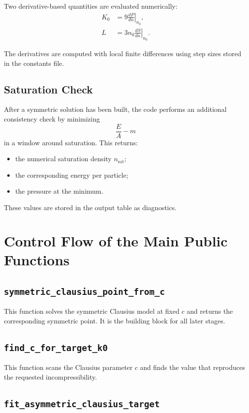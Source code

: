 \documentclass[11pt]{article}
\begin{document}
Two derivative-based quantities are evaluated numerically:
\begin{align}
K_0 &= 9 \left.\frac{dP}{dn}\right|_{n_0}, \\
L &= 3 n_0 \left.\frac{dS}{dn}\right|_{n_0}.
\end{align}

The derivatives are computed with local finite differences using step sizes
stored in the constants file.

\subsection{Saturation Check}

After a symmetric solution has been built, the code performs an additional
consistency check by minimizing
\[
\frac{E}{A} - m
\]
in a window around saturation. This returns:
\begin{itemize}
\item the numerical saturation density $n_{\mathrm{sat}}$;
\item the corresponding energy per particle;
\item the pressure at the minimum.
\end{itemize}

These values are stored in the output table as diagnostics.

\section{Control Flow of the Main Public Functions}

\subsection{\texttt{symmetric\_clausius\_point\_from\_c}}

This function solves the symmetric Clausius model at fixed $c$ and returns the
corresponding symmetric point. It is the building block for all later stages.

\subsection{\texttt{find\_c\_for\_target\_k0}}

This function scans the Clausius parameter $c$ and finds the value that
reproduces the requested incompressibility.

\subsection{\texttt{fit\_asymmetric\_clausius\_target}}
\end{document}
